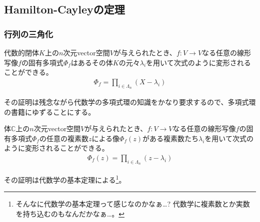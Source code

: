 \documentclass[dvipdfmx]{jsarticle}
\begin{document}
\subsection{Hamilton-Cayleyの定理}%
\subsubsection{行列の三角化}%
\begin{thm}\label{2.2.3.1}
代数的閉体$K$上の$n$次元vector空間$V$が与えられたとき、$f:V \rightarrow V$なる任意の線形写像$f$の固有多項式$\varPhi_{f}$はあるその体$K$の元々$\lambda_{i}$を用いて次式のように変形されることができる。
\begin{align*}
\varPhi_{f} = \prod_{i \in \varLambda_{n}} \left( X - \lambda_{i} \right)
\end{align*}
\end{thm}
その証明は残念ながら代数学の多項式環の知識をかなり要求するので、多項式環の書籍にゆずることにする。
\begin{thm}[代数学の基本定理]\label{2.2.3.2}
体$\mathbb{C}$上の$n$次元vector空間$V$が与えられたとき、$f:V \rightarrow V$なる任意の線形写像$f$の固有多項式$\varPhi_{f}$の任意の複素数$z$による像$\varPhi_{f}(z)$がある複素数たち$\lambda_{i}$を用いて次式のように変形されることができる。
\begin{align*}
\varPhi_{f}(z) = \prod_{i \in \varLambda_{n}} \left( z - \lambda_{i} \right)
\end{align*}
\end{thm}
その証明は代数学の基本定理による\footnote{そんなに代数学の基本定理って感じなのかなぁ…? 代数学に複素数とか実数を持ち込むのもなんだかなぁ…。}。
\end{document}
